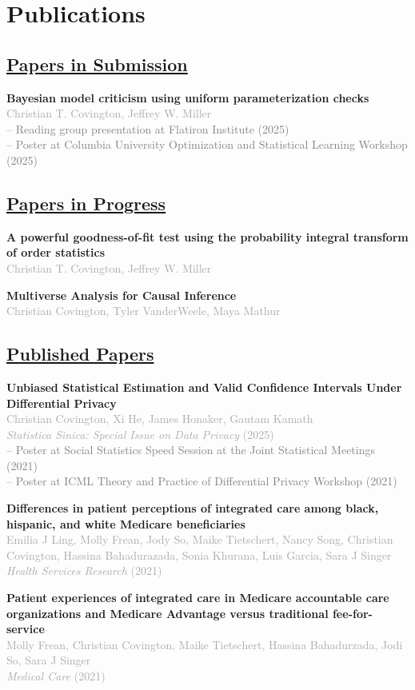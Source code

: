 \documentclass[11pt,a4paper]{article}
\newcommand{\cvpub}[2]{
    \vspace{4pt}
    \noindent\textbf{#1} \\
    \textcolor{darkgray}{#2} \vspace{2pt}
}
\newcommand{\cvpres}[1]{
 \vspace{-6pt}
 \textcolor{gray}{\small \quad -- #1} \vspace{6pt}
}
\begin{document}
\section{Publications}

\subsection{\underline{Papers in Submission}}
\cvpub{Bayesian model criticism using uniform parameterization checks}
      {Christian T. Covington, Jeffrey W. Miller} \\
\cvpres{Reading group presentation at Flatiron Institute (2025)} \\
\cvpres{Poster at Columbia University Optimization and Statistical Learning Workshop (2025)}

\subsection{\underline{Papers in Progress}}
\cvpub{A powerful goodness-of-fit test using the probability integral transform of order statistics}
      {Christian T. Covington, Jeffrey W. Miller}

\cvpub{Multiverse Analysis for Causal Inference}
      {Christian Covington, Tyler VanderWeele, Maya Mathur}

\subsection{\underline{Published Papers}}
\cvpub{Unbiased Statistical Estimation and Valid Confidence Intervals Under Differential Privacy}
      {Christian Covington, Xi He, James Honaker, Gautam Kamath \\ 
       \textit{Statistica Sinica: Special Issue on Data Privacy} (2025)} \\
\cvpres{Poster at Social Statistics Speed Session at the Joint Statistical Meetings (2021)} \\
\cvpres{Poster at ICML Theory and Practice of Differential Privacy Workshop (2021)}

\cvpub{Differences in patient perceptions of integrated care among black, hispanic, and white Medicare beneficiaries}
      {Emilia J Ling, Molly Frean, Jody So, Maike Tietschert, Nancy Song, Christian Covington, Hassina Bahadurazada, Sonia Khurana, Luis Garcia, Sara J Singer \\ 
      \textit{Health Services Research} (2021)}

\cvpub{Patient experiences of integrated care in Medicare accountable care organizations and Medicare Advantage versus traditional fee-for-service}
      {Molly Frean, Christian Covington, Maike Tietschert, Hassina Bahadurzada, Jodi So, Sara J Singer \\ 
      \textit{Medical Care} (2021)}
\end{document}
